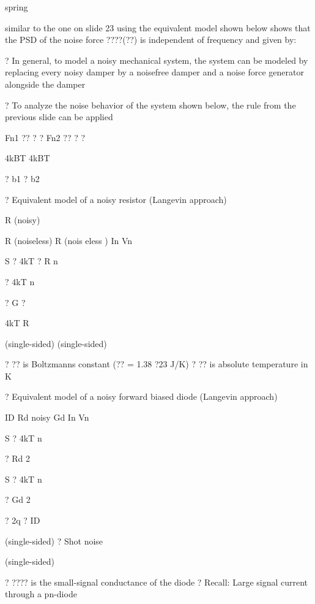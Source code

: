 \documentclass[2pt,landscape]{article}
\begin{document}
\begin{multicols*}{5}
spring


similar to the one on slide 23 using the equivalent model shown below
shows that the PSD of the noise force ????(??) is independent of 
frequency and given by:

?		In general, to model a noisy mechanical system, the system can 
be modeled by replacing every noisy damper by a noisefree damper 
and a noise force generator alongside the damper



?	To analyze the noise behavior of the system shown below, the rule 
from the previous slide can be applied





Fn1 ?? ? ?
Fn2 ?? ? ?


4kBT
4kBT


? b1
? b2



?	Equivalent model of a noisy resistor (Langevin approach)








R (noisy)


R (noiseless)
R 
(nois
eless
)	In Vn







S	? 4kT ? R
n


? 4kT
n


? G ?


4kT R


(single-sided)	(single-sided)



?	?? is Boltzmann\textbullet s constant (?? = 1.38 ?23 J/K)
?	?? is absolute temperature in K



?	Equivalent model of a noisy forward biased diode (Langevin 
approach)


ID	Rd
noisy		Gd	In 
Vn



S	? 4kT
n


? Rd
2


S	? 4kT
n


? Gd
2


? 2q ? ID


(single-sided)
?	Shot noise


(single-sided)



?	???? is the small-signal conductance of the diode
?	Recall: Large signal current through a pn-diode





\end{multicols*}
\end{document}
